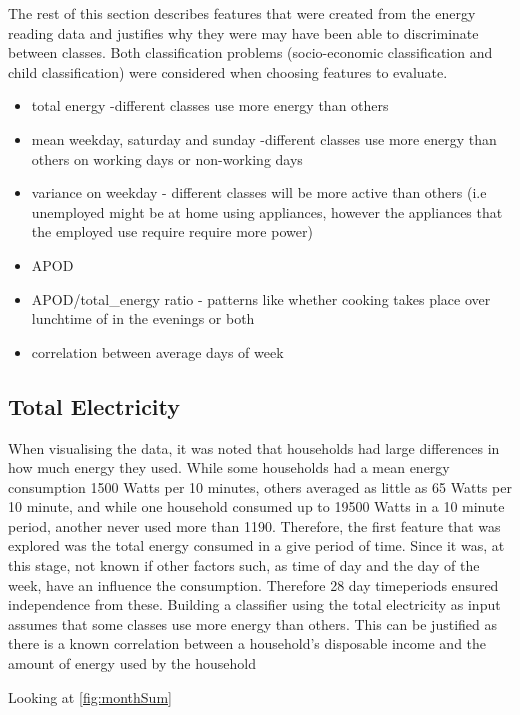 The rest of this section describes features that were created from the energy reading data and justifies why they were may have been able to discriminate between classes. Both classification problems (socio-economic classification and child classification) were considered when choosing features to evaluate.

\begin{itemize}
\item total energy -different classes use more energy than others
\item mean weekday, saturday and sunday  -different classes use more energy than others on working days or non-working days
\item variance on weekday - different classes will be more active than others (i.e unemployed might be at home using appliances, however the appliances that the employed use require require more power)
\item APOD
\item APOD/total\_energy ratio - patterns like whether cooking takes place over lunchtime of in the evenings or both
\item correlation between average days of week
\end{itemize}

\subsection{Total Electricity}
When visualising the data, it was noted that households had large differences in how much energy they used. While some households had a mean energy consumption 1500 Watts per 10 minutes, others averaged as little as 65 Watts per 10 minute, and while one household consumed up to 19500 Watts in a 10 minute period, another never used more than 1190. Therefore, the first feature that was explored was the total energy consumed in a give period of time. Since it was, at this stage, not known if other factors such, as time of day and the day of the week, have an influence the consumption. Therefore 28 day timeperiods ensured independence from these.
Building a classifier using the total electricity as input assumes that some classes use more energy than others. This can be justified as there is a known correlation between a household's disposable income and the amount of energy used by the household \cite{Gomez}

\monthSum

Looking at \ref{fig:monthSum}


